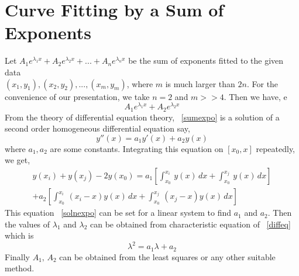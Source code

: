 \documentclass[aima203_lecturenotes_ku.tex]{subfiles}
\begin{document}
\section{Curve Fitting by a Sum of Exponents}
Let $\displaystyle A_1e^{\lambda_1 x} + A_2e^{\lambda _2 x} + ... + A_ne^{\lambda_n x}$ be the sum of exponents fitted to the given data \\ $(x_1,y_1), (x_2,y_2),...,(x_m,y_m)$, where $m$ is much larger than $2n$. For the convenience of our presentation, we take $n=2$ and $m >> 4$. Then we have,
e
\begin{equation}
  \label{sumexpo}
   A_1e^{\lambda_1 x} + A_2e^{\lambda _2 x}
 \end{equation}
 From the theory of differential equation theory, ~\ref{sumexpo} is a solution of a second order homogeneous differential equation say,
 \begin{equation}
   \label{diffeq}
   y''(x) = a_1y'(x) + a_2y(x)
 \end{equation}
 where $a_1, a_2$ are some constants. Integrating this equation on $[x_0, x]$ repeatedly, we get,
 \begin{equation}
   \label{solnexpo}
   \begin{gathered}
   y(x_i) + y(x_j) - 2y(x_0) = a_1\left [ \int_{x_0}^{x_i}\, y(x)\, dx + \int_{x_0}^{x_j}\, y(x)\, dx \right ] \\[2mm]
   + a_2\left [ \int_{x_0}^{x_i}\, (x_i -x )y(x)\, dx + \int_{x_0}^{x_j}\, (x_j - x) y(x)\, dx  \right ]
   \end{gathered}
 \end{equation}
This equation ~\ref{solnexpo} can be set for a linear system to find $a_1$ and $a_2$. Then the values of $\lambda_1$ and $\lambda_2$ can be obtained from characteristic equation of ~\ref{diffeq} which is
\begin{equation}
  \label{eq:9}
  \lambda^2 = a_1 \lambda + a_2
\end{equation}
Finally $A_1, \, A_2$ can be obtained from the least squares or any other suitable method.
\end{document}
